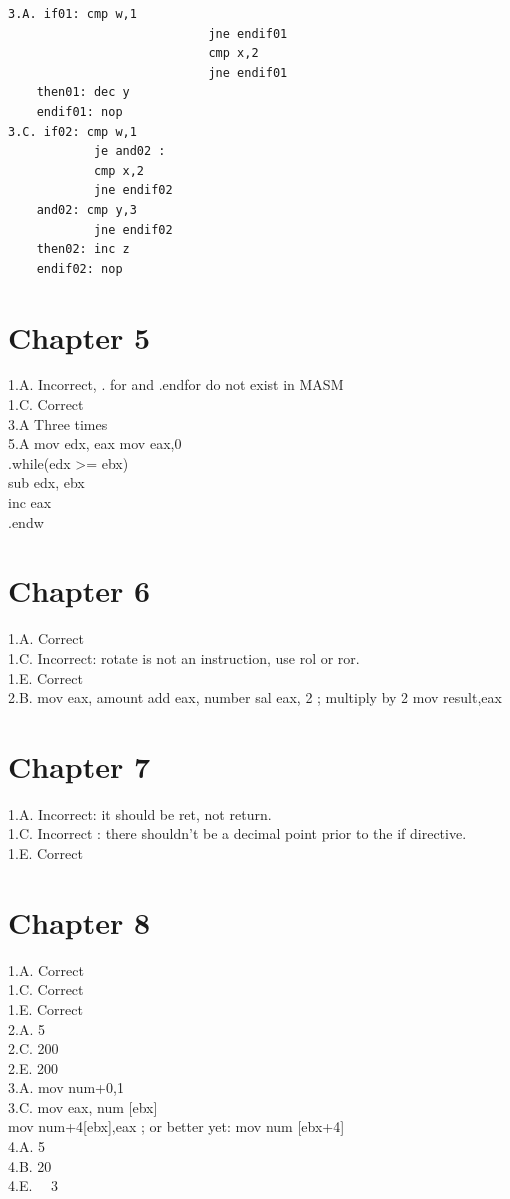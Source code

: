 \documentclass[10pt]{book}
\begin{document}
\begin{verbatim}
3.A. if01: cmp w,1
                            jne endif01
                            cmp x,2
                            jne endif01
    then01: dec y
    endif01: nop
3.C. if02: cmp w,1
            je and02 :
            cmp x,2
            jne endif02
    and02: cmp y,3
            jne endif02
    then02: inc z
    endif02: nop
\end{verbatim}

\section*{Chapter 5}
1.A. Incorrect, . for and .endfor do not exist in MASM\\
1.C. Correct\\
3.A Three times\\
5.A mov edx, eax mov eax,0\\
.while(edx >= ebx)\\
sub edx, ebx\\
inc eax\\
.endw

\section*{Chapter 6}
1.A. Correct\\
1.C. Incorrect: rotate is not an instruction, use rol or ror.\\
1.E. Correct\\
2.B. mov eax, amount add eax, number sal eax, 2 ; multiply by 2 mov result,eax

\section*{Chapter 7}
1.A. Incorrect: it should be ret, not return.\\

1.C. Incorrect : there shouldn't be a decimal point prior to the if directive.\\
1.E. Correct

\section*{Chapter 8}
1.A. Correct\\
1.C. Correct\\
1.E. Correct\\
2.A. 5\\
2.C. 200\\
2.E. 200\\
3.A. mov num+0,1\\[0pt]
3.C. mov eax, num [ebx]\\[0pt]
mov num+4[ebx],eax ; or better yet: mov num [ebx+4]\\
4.A. 5\\
4.B. 20\\
4.E. $\quad 3$
\end{document}
